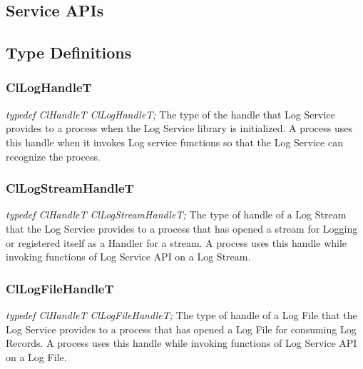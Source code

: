 \begin{flushleft}
\chapter{Service APIs}

\section{Type Definitions}

\subsection{ClLogHandleT}
\textit{typedef ClHandleT ClLogHandleT;}
\newline
\newline
The type of the handle that Log Service provides to a process when the Log Service library is initialized. 
A process uses this handle when it invokes Log service functions so that the Log Service can recognize the process.


\subsection{ClLogStreamHandleT}
\textit{typedef ClHandleT ClLogStreamHandleT;}
\newline
\newline
The type of handle of a Log Stream that the Log Service provides to a process that has opened a stream for Logging or registered itself as a Handler for
a stream. A process uses this handle while invoking functions of Log Service API on a Log Stream.


\subsection{ClLogFileHandleT}
\textit{typedef ClHandleT ClLogFileHandleT;}
\newline
\newline
The type of handle of a Log File that the Log Service provides to a process that has opened a Log File for consuming Log Records.
A process uses this handle while invoking functions of Log Service API on a Log File.




\end{flushleft}
